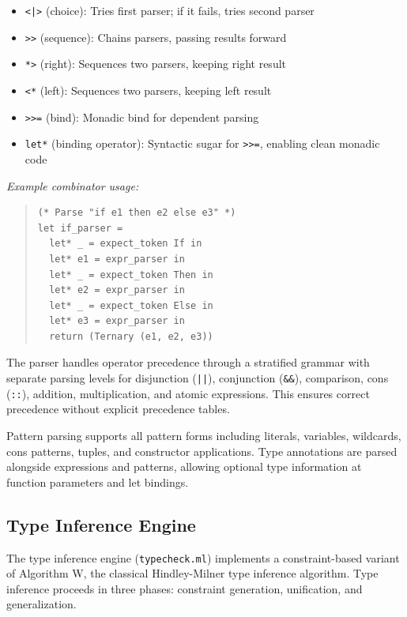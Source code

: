 \documentclass[conference,onecolumn]{IEEEtran}
\begin{document}
\begin{itemize}
\item \texttt{<|>} (choice): Tries first parser; if it fails, tries second parser
\item \texttt{>>} (sequence): Chains parsers, passing results forward
\item \texttt{*>} (right): Sequences two parsers, keeping right result
\item \texttt{<*} (left): Sequences two parsers, keeping left result
\item \texttt{>>=} (bind): Monadic bind for dependent parsing
\item \texttt{let*} (binding operator): Syntactic sugar for \texttt{>>=}, enabling clean monadic code
\end{itemize}

\textit{Example combinator usage:}

\begin{quote}
\small
\begin{verbatim}
(* Parse "if e1 then e2 else e3" *)
let if_parser = 
  let* _ = expect_token If in
  let* e1 = expr_parser in
  let* _ = expect_token Then in
  let* e2 = expr_parser in
  let* _ = expect_token Else in
  let* e3 = expr_parser in
  return (Ternary (e1, e2, e3))
\end{verbatim}
\end{quote}

The parser handles operator precedence through a stratified grammar with separate parsing levels for disjunction (\texttt{||}), conjunction (\texttt{\&\&}), comparison, cons (\texttt{::}), addition, multiplication, and atomic expressions. This ensures correct precedence without explicit precedence tables.

Pattern parsing supports all pattern forms including literals, variables, wildcards, cons patterns, tuples, and constructor applications. Type annotations are parsed alongside expressions and patterns, allowing optional type information at function parameters and let bindings.

\subsection{Type Inference Engine}

The type inference engine (\texttt{typecheck.ml}) implements a constraint-based variant of Algorithm W, the classical Hindley-Milner type inference algorithm. Type inference proceeds in three phases: constraint generation, unification, and generalization.
\end{document}
